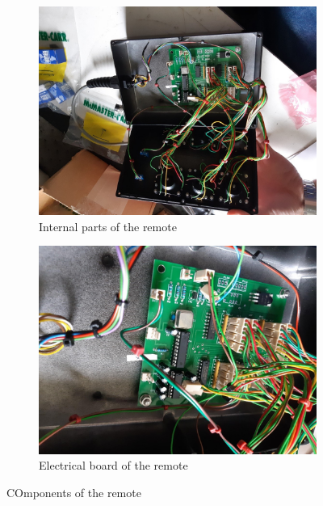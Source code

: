 \documentclass[12pt, a4paper]{article}
\begin{document}
\begin{figure}[h]
	
	\begin{subfigure}[t]{0.5\textwidth}
		\centering
		\includegraphics[width=\textwidth]{remote_internal} 
		\caption{Internal parts of the remote}
		\label{fig:remote_in}
	\end{subfigure}
	
	\begin{subfigure}[t]{0.5\textwidth}
		\centering
		\includegraphics[width=\textwidth]{remote_board}
		\caption{Electrical board of the remote}
		\label{fig:remote_board}
	\end{subfigure}
 
	\caption{COmponents of the remote}
	\label{fig:image2}
\end{figure}
\end{document}
